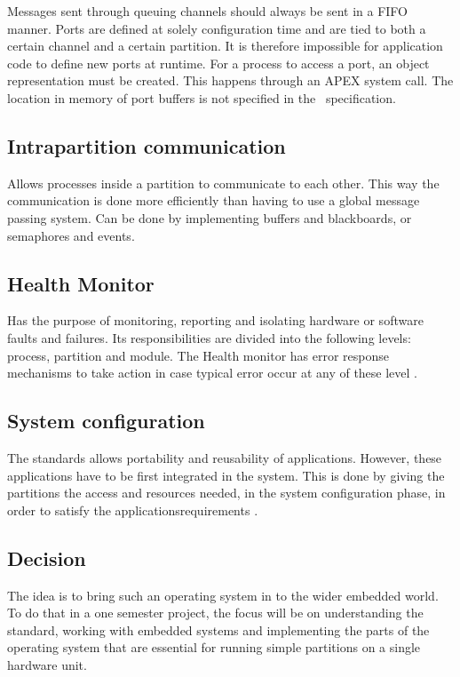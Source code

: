 Messages sent through queuing channels should always be sent in a FIFO manner.
Ports are defined at solely configuration time and are tied to both a certain channel and a certain partition.
It is therefore impossible for application code to define new ports at runtime. 
For a process to access a port, an object representation must be created. This happens through an APEX system call.
The location in memory of port buffers is not specified in the \arinc\ specification.
\fi

\subsection{Intrapartition communication}
Allows processes inside a partition to communicate to each other. This way
the communication is done more efficiently than having to use a 
global message passing system.
Can be done by implementing buffers and blackboards, or semaphores and 
events\cite{arinc_page_36}.

\subsection{Health Monitor}
Has the purpose of monitoring, reporting and isolating hardware or
software faults and failures. Its responsibilities are divided into
the following levels: process, partition and module. The Health monitor has 
error response mechanisms to take action in case typical
error occur at any of these level
\cite{arinc_page_40}.

\subsection{System configuration}
The standards allows portability and reusability of applications. However,
these applications have to be first integrated in the system. This is done
by giving the partitions the access and resources needed,
in the system configuration phase, in order to
satisfy the applications\textquotesingle requirements \cite{arinc_page_42}.

\subsection{Decision}
The idea is to bring such an operating system in to the wider embedded world.
To do that in a one semester project, the focus will be on understanding the standard,
working with embedded systems and implementing the parts of the operating system that are
essential for running simple partitions on a single hardware unit.

